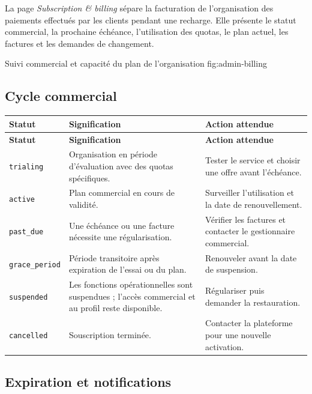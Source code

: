 La page \emph{Subscription \& billing} sépare la facturation de l'organisation
des paiements effectués par les clients pendant une recharge. Elle présente le
statut commercial, la prochaine échéance, l'utilisation des quotas, le plan
actuel, les factures et les demandes de changement.

  {Suivi commercial et capacité du plan de l'organisation}
  {fig:admin-billing}

\subsection{Cycle commercial}

\begin{longtable}{|L{3.1cm}|L{7.2cm}|L{4.8cm}|}
  \hline
  \textbf{Statut} & \textbf{Signification} & \textbf{Action attendue} \\ \hline
  \endfirsthead
  \hline
  \textbf{Statut} & \textbf{Signification} & \textbf{Action attendue} \\ \hline
  \endhead
  \texttt{trialing} &
  Organisation en période d'évaluation avec des quotas spécifiques. &
  Tester le service et choisir une offre avant l'échéance. \\ \hline
  \texttt{active} &
  Plan commercial en cours de validité. &
  Surveiller l'utilisation et la date de renouvellement. \\ \hline
  \texttt{past\_due} &
  Une échéance ou une facture nécessite une régularisation. &
  Vérifier les factures et contacter le gestionnaire commercial. \\ \hline
  \texttt{grace\_period} &
  Période transitoire après expiration de l'essai ou du plan. &
  Renouveler avant la date de suspension. \\ \hline
  \texttt{suspended} &
  Les fonctions opérationnelles sont suspendues ; l'accès commercial et au
  profil reste disponible. &
  Régulariser puis demander la restauration. \\ \hline
  \texttt{cancelled} &
  Souscription terminée. &
  Contacter la plateforme pour une nouvelle activation. \\ \hline
\end{longtable}

\subsection{Expiration et notifications}

